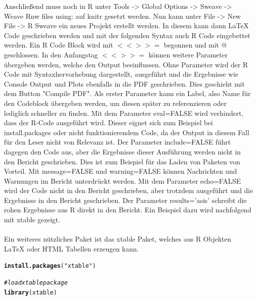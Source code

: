 \documentclass{article}\usepackage[]{graphicx}\usepackage[]{color}
\makeatletter
\newcommand{\hlstr}[1]{\textcolor[rgb]{0.192,0.494,0.8}{#1}}%
\newcommand{\hlcom}[1]{\textcolor[rgb]{0.678,0.584,0.686}{\textit{#1}}}%
\newcommand{\hlstd}[1]{\textcolor[rgb]{0.345,0.345,0.345}{#1}}%
\newcommand{\hlkwd}[1]{\textcolor[rgb]{0.737,0.353,0.396}{\textbf{#1}}}%
\newenvironment{kframe}{%
 \def\at@end@of@kframe{}%
 \ifinner\ifhmode%
  \def\at@end@of@kframe{\end{minipage}}%
  \begin{minipage}{\columnwidth}%
 \fi\fi%
 \def\FrameCommand##1{\hskip\@totalleftmargin \hskip-\fboxsep
 \colorbox{shadecolor}{##1}\hskip-\fboxsep
     \hskip-\linewidth \hskip-\@totalleftmargin \hskip\columnwidth}%
 \MakeFramed {\advance\hsize-\width
   \@totalleftmargin\z@ \linewidth\hsize
   \@setminipage}}%
 {\par\unskip\endMakeFramed%
 \at@end@of@kframe}
\newenvironment{knitrout}{}{} %
\makeatother
\begin{document}
Anschließend muss noch in R unter Tools -> Global Options -> Sweave -> Weave Rnw files using: auf knitr gesetzt werden. Nun kann unter File -> New File -> R Sweave ein neues Projekt erstellt werden. In diesem kann dann LaTeX Code geschrieben werden und mit der folgenden Syntax auch R Code eingebettet werden. Ein R Code Block wird mit $<<>>=$ begonnen und mit $@$ geschlossen. In den Anfangstag $<<>>=$ können weitere Parameter übergeben werden, welche den Output beeinflussen. Ohne Parameter wird der R Code mit Syntaxhervorhebung dargestellt, ausgeführt und die Ergebnisse wie Console Output und Plots ebenfalls in die PDF geschrieben. Dies geschieht mit dem Button "Compile PDF". Als erster Parameter kann ein Label, also Name für den Codeblock übergeben werden, um diesen später zu referenzieren oder lediglich schneller zu finden. Mit dem Parameter eval=FALSE wird verhindert, dass der R-Code ausgeführt wird. Dieser eignet sich zum Beispiel bei install.packages oder nicht funktionierendem Code, da der Output in diesem Fall für den Leser nicht von Relevanz ist. Der Parameter include=FALSE führt dagegen den Code aus, aber die Ergebnisse dieser Ausführung werden nicht in den Bericht geschrieben. Dies ist zum Beispiel für das Laden von Paketen von Vorteil. Mit message=FALSE und warning=FALSE können Nachrichten und Warnungen im Bericht unterdrückt werden.
Mit dem Parameter echo=FALSE wird der Code nicht in den Bericht geschrieben, aber trotzdem ausgeführt und die Ergebnisse in den Bericht geschrieben. Der Parameter results='asis' schreibt die rohen Ergebnisse aus R direkt in den Bericht. Ein Beispiel dazu wird nachfolgend mit xtable gezeigt.\\
\\
Ein weiteres nützliches Paket ist das xtable Paket, welches aus R Objekten LaTeX oder HTML Tabellen erzeugen kann.
\begin{knitrout}
\color{fgcolor}\begin{kframe}
\begin{alltt}
\hlkwd{install.packages}\hlstd{(}\hlstr{"xtable"}\hlstd{)}
\end{alltt}
\end{kframe}
\end{knitrout}

\begin{knitrout}
\color{fgcolor}\begin{kframe}
\begin{alltt}
\hlcom{#load xtable package}
\hlkwd{library}\hlstd{(xtable)}
\end{alltt}
\end{kframe}
\end{knitrout}
\end{document}
